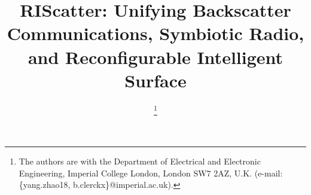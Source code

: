 \documentclass[journal]{IEEEtran}
\begin{document}
\title{RIScatter: Unifying Backscatter Communications, Symbiotic Radio, and Reconfigurable Intelligent Surface}
\author{
	\thanks{
		The authors are with the Department of Electrical and Electronic Engineering, Imperial College London, London SW7 2AZ, U.K. (e-mail: \{yang.zhao18, b.clerckx\}@imperial.ac.uk).
	}
}
\maketitle
\end{document}
